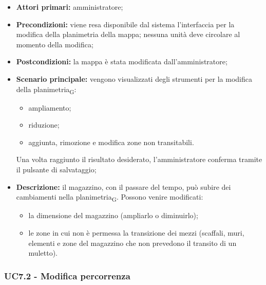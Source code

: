 \begin{itemize}

  \item   \textbf{Attori primari:} amministratore;

  \item   \textbf{Precondizioni:} viene resa disponibile dal sistema l'interfaccia per la modifica della planimetria della mappa; nessuna unità deve circolare al momento della modifica;

 \item   \textbf{Postcondizioni:} la mappa è stata modificata dall'amministratore;

 \item   \textbf{Scenario principale:} vengono visualizzati degli strumenti per la modifica della planimetria\textsubscript{G}:

 \begin{itemize}

      \item ampliamento;

    \item riduzione;
      \item aggiunta, rimozione e modifica zone non transitabili.

  \end{itemize}

  Una volta raggiunto il risultato desiderato, l'amministratore conferma tramite il pulsante di salvataggio;

  \item   \textbf{Descrizione:} il magazzino, con il passare del tempo, può subire dei cambiamenti nella planimetria\textsubscript{G}. Possono venire modificati:

\begin{itemize}

     \item la dimensione del magazzino (ampliarlo o diminuirlo);
     \item le zone in cui non è permessa la transizione dei mezzi (scaffali, muri, elementi e zone del magazzino che non prevedono il transito di un muletto).

  \end{itemize}

\end{itemize}



\subsubsection{UC7.2 - Modifica percorrenza}

